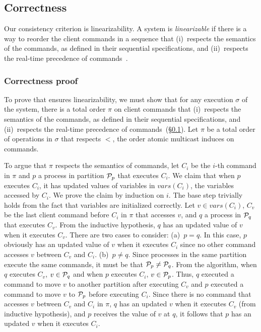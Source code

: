 \subsection{Correctness}
\label{sec:dynastar-correctness}

Our consistency criterion is linearizability.  A system is \emph{linearizable}
if there is a way to reorder the client commands in a sequence that (i)~respects
the semantics of the commands, as defined in their sequential specifications,
and (ii)~respects the real-time precedence of commands~\cite{Attiya04}.

\subsubsection{Correctness proof}
To prove that \dynastar ensures linearizability, we must show that for any
execution $\sigma$ of the system, there is a total order $\pi$ on client
commands that (i)~respects the semantics of the commands, as defined in their
sequential specifications, and (ii)~respects the real-time precedence of
commands~(\S\ref{sec:dynastar-correctness}).
%
Let $\pi$ be a total order of operations in $\sigma$ that respects $<$, the
order atomic multicast induces on commands.

To argue that $\pi$ respects the semantics of  commands, let $C_i$ be the $i$-th
command in $\pi$ and $p$ a process in partition $\mathcal{P}_p$ that executes $C_i$.
We claim that when $p$ executes $C_i$, it has updated values of variables in
$vars(C_i)$, the variables accessed by $C_i$. We prove the claim by induction on
$i$. The base step trivially holds from the fact that variables are initialized
correctly. Let $v \in vars(C_i)$, $C_v$ be the last client command before $C_i$
in $\pi$ that accesses $v$, and $q$ a process in $\mathcal{P}_q$ that executes $C_v$.
From the inductive hypothesis, $q$ has an updated value of $v$ when it executes
$C_v$. There are two cases to consider: (a)~$p = q$. In this case, $p$ obviously
has an updated value of $v$ when it executes $C_i$ since no other command
accesses $v$ between $C_v$ and $C_i$. (b)~$p \neq q$. Since processes in the
same partition execute the same commands, it must be that $\mathcal{P}_p \neq \mathcal{P}_q$.
From the algorithm, when $q$ executes $C_v$, $v \in \mathcal{P}_q$ and when $p$
executes $C_i$, $v \in \mathcal{P}_p$. Thus, $q$ executed a command to move $v$ to
another partition after executing $C_v$ and $p$ executed a command to move $v$
to $\mathcal{P}_p$ before executing $C_i$. Since there is no command that accesses $v$
between $C_v$ and $C_i$ in $\pi$, $q$ has an updated $v$ when it executes $C_v$
(from inductive hypothesis), and $p$ receives the value of $v$ at $q$, it
follows that $p$ has an updated $v$ when it executes $C_i$.

